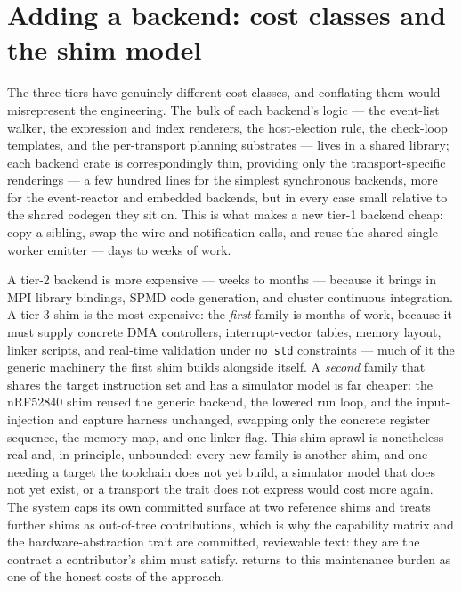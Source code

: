 \section{Adding a backend: cost classes and the shim model}\label{sec:be-cost}

The three tiers have genuinely different cost classes, and conflating them would
misrepresent the engineering. The bulk of each backend's logic --- the event-list
walker, the expression and index renderers, the host-election rule, the
check-loop templates, and the per-transport planning substrates --- lives in a
shared library; each backend crate is correspondingly thin, providing only the
transport-specific renderings --- a few hundred lines for the simplest synchronous
backends, more for the event-reactor and embedded backends, but in every case
small relative to the shared codegen they sit on. This is what makes a new tier-1
backend cheap: copy a sibling, swap the wire and notification calls, and reuse the
shared single-worker emitter --- days to weeks of work.

A tier-2 backend is more expensive --- weeks to months --- because it brings in
MPI library bindings, SPMD code generation, and cluster continuous integration. A
tier-3 shim is the most expensive: the \emph{first} family is months of work,
because it must supply concrete DMA controllers, interrupt-vector tables, memory
layout, linker scripts, and real-time validation under \texttt{no\_std} constraints
--- much of it the generic machinery the first shim builds alongside itself. A
\emph{second} family that shares the target instruction set and has a simulator
model is far cheaper: the nRF52840 shim reused the generic backend, the lowered run
loop, and the input-injection and capture harness unchanged, swapping only the
concrete register sequence, the memory map, and one linker flag. This shim sprawl is
nonetheless real and, in principle, unbounded: every new family is another shim, and
one needing a target the toolchain does not yet build, a simulator model that does
not yet exist, or a transport the trait does not express would cost more again. The
system caps its own committed surface at two reference shims and treats further
shims as out-of-tree contributions, which is why the capability
matrix and the hardware-abstraction trait are committed, reviewable text: they are
the contract a contributor's shim must satisfy.  returns to
this maintenance burden as one of the honest costs of the approach.
